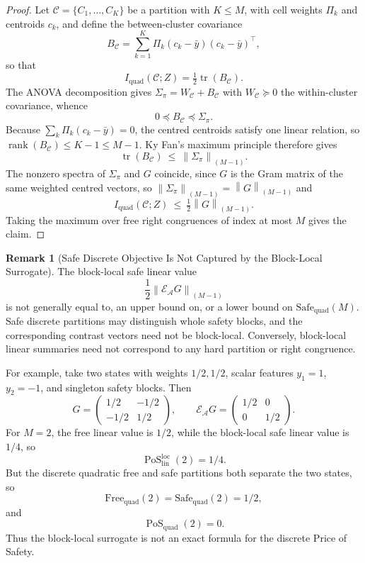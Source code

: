 \documentclass[12pt]{article}
\theoremstyle{definition}
\newtheorem{remark}[theorem]{Remark}
\DeclareMathOperator{\rank}{rank}
\DeclareMathOperator{\tr}{tr}
\DeclareMathOperator{\PoS}{PoS}
\newcommand{\EA}{\mathcal E_{\mathcal A}}
\newcommand{\KyF}[2]{\left\|#1\right\|_{(#2)}}
\newcommand{\PoSlin}{\PoS_{\mathrm{lin}}^{\mathrm{loc}}}
\newcommand{\PoSquad}{\PoS_{\mathrm{quad}}}
\begin{document}
\begin{proof}
Let $\mathcal C=\{C_1,\dots,C_K\}$ be a partition with $K\le M$, with cell
weights $\Pi_k$ and centroids $c_k$, and define the between-cluster covariance
\[
B_{\mathcal C}
=
\sum_{k=1}^K\Pi_k(c_k-\bar y)(c_k-\bar y)^\top ,
\]
so that
\[
I_{\mathrm{quad}}(\mathcal C;Z)=\tfrac12\tr(B_{\mathcal C}).
\]
The ANOVA decomposition gives $\Sigma_\pi=W_{\mathcal C}+B_{\mathcal C}$ with
$W_{\mathcal C}\succeq0$ the within-cluster covariance, whence
\[
0\preceq B_{\mathcal C}\preceq\Sigma_\pi .
\]
Because $\sum_k\Pi_k(c_k-\bar y)=0$, the centred centroids satisfy one linear
relation, so $\rank(B_{\mathcal C})\le K-1\le M-1$.  Ky Fan's maximum
principle \cite{kyfan1951} therefore gives
\[
\tr(B_{\mathcal C})\ \le\ \KyF{\Sigma_\pi}{M-1}.
\]
The nonzero spectra of $\Sigma_\pi$ and $G$ coincide, since $G$ is the Gram
matrix of the same weighted centred vectors, so
$\KyF{\Sigma_\pi}{M-1}=\KyF{G}{M-1}$ and
\[
I_{\mathrm{quad}}(\mathcal C;Z)\ \le\ \tfrac12\KyF{G}{M-1}.
\]
Taking the maximum over free right congruences of index at most $M$ gives the
claim.
\end{proof}

\begin{remark}[Safe Discrete Objective Is Not Captured by the Block-Local Surrogate]
\label{rem:safe-discrete-not-captured}
The block-local safe linear value
\[
\frac12
\KyF{\EA G}{M-1}
\]
is not generally equal to, an upper bound on, or a lower bound on
$\mathrm{Safe}_{\mathrm{quad}}(M)$.  Safe discrete partitions may distinguish
whole safety blocks, and the corresponding contrast vectors need not be
block-local.  Conversely, block-local linear summaries need not correspond to
any hard partition or right congruence.

For example, take two states with weights $1/2,1/2$, scalar features
$y_1=1$, $y_2=-1$, and singleton safety blocks.  Then
\[
G=
\begin{pmatrix}
1/2 & -1/2\\
-1/2 & 1/2
\end{pmatrix},
\qquad
\EA G=
\begin{pmatrix}
1/2 & 0\\
0 & 1/2
\end{pmatrix}.
\]
For $M=2$, the free linear value is $1/2$, while the block-local safe linear
value is $1/4$, so
\[
\PoSlin(2)=1/4.
\]
But the discrete quadratic free and safe partitions both separate the two
states, so
\[
\mathrm{Free}_{\mathrm{quad}}(2)
=
\mathrm{Safe}_{\mathrm{quad}}(2)
=
1/2,
\]
and
\[
\PoSquad(2)=0.
\]
Thus the block-local surrogate is not an exact formula for the discrete Price
of Safety.
\end{remark}
\end{document}
